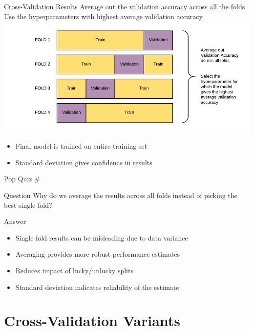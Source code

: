 \documentclass[usenames,dvipsnames]{beamer}
\newcounter{popquiz}
\begin{document}
\begin{frame}{Cross-Validation Results}
Average out the validation accuracy across all the folds\\
Use the hyperparameters with highest average validation accuracy\\
\includegraphics[width = \textwidth]{../assets/cross-validation/diagrams/cross-validation-avg.pdf}
\begin{itemize}
	\item \pause Final model is trained on entire training set
	\item \pause Standard deviation gives confidence in results
\end{itemize}
\end{frame}

\begin{frame}{Pop Quiz \#\thepopquiz}
\begin{block}{Question}
Why do we average the results across all folds instead of picking the best single fold?
\end{block}
\pause
\begin{block}{Answer}
\begin{itemize}
	\item Single fold results can be misleading due to data variance
	\item Averaging provides more robust performance estimates
	\item Reduces impact of lucky/unlucky splits
	\item Standard deviation indicates reliability of the estimate
\end{itemize}
\end{block}
\end{frame}

\section{Cross-Validation Variants}
\end{document}
